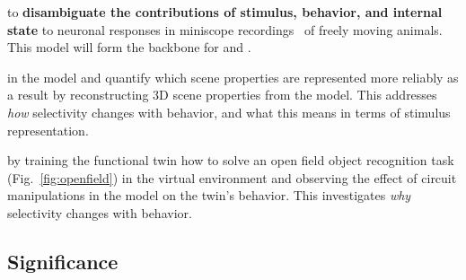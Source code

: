 \documentclass[B2,COG]{ercgrant}
\begin{document}
 \textbf{\oonetitle} to \textbf{disambiguate the contributions of stimulus, behavior, and internal state} to neuronal responses in miniscope recordings~\parencite[see Fig.~\ref{fig:miniscope}]{Cai2016-rh} of freely moving animals. This model will form the backbone for  and .

 \textbf{\otwotitle} in the model and quantify which scene properties are represented more reliably as a result by reconstructing 3D scene properties from the model. This addresses \textit{how} selectivity changes with behavior, and what this means in terms of stimulus representation. 

 \textbf{\othreetitle} by training the functional twin how to solve an open field object recognition task (Fig.~\ref{fig:openfield}) in the virtual environment and observing the effect of circuit manipulations in the model on the twin's behavior. 
This investigates \textit{why} selectivity changes with behavior.

\subsection{Significance}
\end{document}
